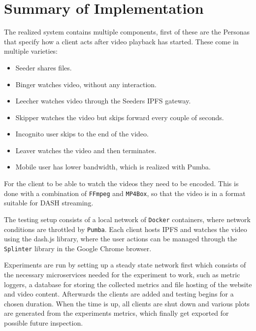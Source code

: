\section{Summary of Implementation}
The realized system contains multiple components, first of these are the Personas that specify how a client acts after video playback has started. These come in multiple varieties:
\begin{itemize}
    \item Seeder shares files.
    \item Binger watches video, without any interaction.
    \item Leecher watches video through the Seeders \ac{IPFS} gateway.
    \item Skipper watches the video but skips forward every couple of seconds.
    \item Incognito user skips to the end of the video.
    \item Leaver watches the video and then terminates.
    \item Mobile user has lower bandwidth, which is realized with Pumba.
\end{itemize}

For the client to be able to watch the videos they need to be encoded. This is done with a combination of \texttt{FFmpeg} and \texttt{MP4Box}, so that the video is in a format suitable for \ac{DASH} streaming.

The testing setup consists of a local network of \texttt{Docker} containers, where network conditions are throttled by \texttt{Pumba}. Each client hosts \ac{IPFS} and watches the video using the dash.js library, where the user actions can be managed through the \texttt{Splinter} library in the Google Chrome browser.

Experiments are run by setting up a steady state network first which consists of the necessary microservices needed for the experiment to work, such as metric loggers, a database for storing the collected metrics and file hosting of the website and video content. Afterwards the clients are added and testing begins for a chosen duration. When the time is up, all clients are shut down and various plots are generated from the experiments metrics, which finally get exported for possible future inspection.
